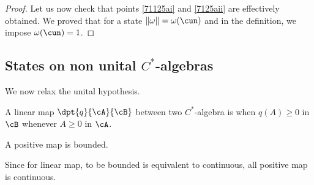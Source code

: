\begin{proof}
Let us now check that points \ref{71125ai} and \ref{7125aii} are effectively obtained. We proved that for a state $\| \omega \|=\omega(\cun)$ and in the definition, we impose $\omega(\cun)=1$.

\end{proof}

\subsection{States on non unital \texorpdfstring{$C^*$}{C*}-algebras}

We now relax the unital hypothesis. 

\begin{definition}  \label{DefApplPositive}
    A linear map $\dpt{q}{\cA}{\cB}$ between two $C^*$-algebra is  when $q(A)\geq 0$ in $\cB$ whenever $A\geq 0$ in $\cA$.
\end{definition}

\begin{proposition}
A positive map is bounded.\label{prop:posborn}
\end{proposition}

Since for linear map, to be bounded is equivalent to continuous, all positive map is continuous.

